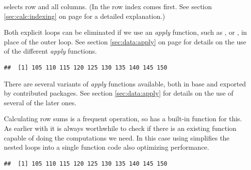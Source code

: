 \documentclass[krantz2]{krantz}\usepackage{knitr}%
\begin{document}
\begin{explainbox}
 selects row  and all columns. (In \Rlang the row index comes first. See section \ref{sec:calc:indexing} on page \pageref{sec:calc:indexing} for a detailed explanation.)

Both explicit loops can be eliminated if we use an \emph{apply} function, such as ,  or , in place of the outer  loop. See section \ref{sec:data:apply} on page \pageref{sec:data:apply} for details on the use of the different \emph{apply} functions.

\begin{knitrout}\footnotesize
{}\color{fgcolor}\begin{kframe}
\begin{alltt}
 \hlkwb{<-}   \hlstd{=}  
\end{alltt}
\begin{verbatim}
##  [1] 105 110 115 120 125 130 135 140 145 150
\end{verbatim}
\end{kframe}
\end{knitrout}
There are several variants of \emph{apply} functions available, both in base \Rlang and exported by contributed packages. See section \ref{sec:data:apply} for details on the use of several of the later ones.

Calculating row sums is a frequent operation, so \Rlang has a built-in function for this. As earlier with  it is always worthwhile to check if there is an existing \Rlang function capable of doing the computations we need. In this case using  simplifies the nested loops into a single function code also optimizing performance.

\begin{knitrout}\footnotesize
{}\color{fgcolor}\begin{kframe}
\begin{alltt}
\end{alltt}
\begin{verbatim}
##  [1] 105 110 115 120 125 130 135 140 145 150
\end{verbatim}
\end{kframe}
\end{knitrout}

\end{explainbox}
\end{document}
